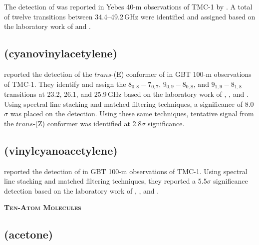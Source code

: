 \documentclass[twocolumn]{aastex631}
\newcommand{\update}[1]{{#1}}
\begin{document}
	\update{The detection of  was reported in Yebes 40-m observations of TMC-1 by \citet{Cernicharo:2021kc}.  A total of twelve transitions between 34.4--49.2\,GHz were identified and assigned based on the laboratory work of \citet{Lee:2019bc} and \citet{McCarthy:2020fm}.}
	
	\subsection{\update{ (cyanovinylacetylene)}}
	\label{HCCCHCHCN}
	
	\update{\citet{Lee:2021pd} reported the detection of the $trans$-(E) conformer of \ce{HCCCHCHCN} in GBT 100-m observations of TMC-1.  They identify and assign the $8_{0,8} - 7_{0,7}$, $9_{0,9} - 8_{0,8}$, and $9_{1,9} - 8_{1,8}$ transitions at 23.2, 26.1, and 25.9\,GHz based on the laboratory work of \citet{Halter:2001cx}, \citet{2004JMoSp.225...93T}, and \citet{McCarthy:2020fm}.  Using spectral line stacking and matched filtering techniques, a significance of 8.0$\sigma$ was placed on the detection.  Using these same techniques, tentative signal from the $trans$-(Z) conformer was identified at 2.8$\sigma$ significance.}
	
	\subsection{\update{ (vinylcyanoacetylene)}}
	\label{H2CCHC3N}
	
	\update{\citet{Lee:2021pd} reported the detection of \ce{H2CCHC3N} in GBT 100-m observations of TMC-1.  Using spectral line stacking and matched filtering techniques, they reported a 5.5$\sigma$ significance detection based on the laboratory work of \citet{Halter:2001cx}, \citet{2004JMoSp.225...93T}, and \citet{McCarthy:2020fm}.}
	
    
    \begin{center}
        \large
        \textsc{\textbf{Ten-Atom Molecules}}
        \label{10atoms}
        \normalsize
    \end{center}    
    
    \subsection{ (acetone)}
	\label{CH3COCH3}
	
\end{document}
